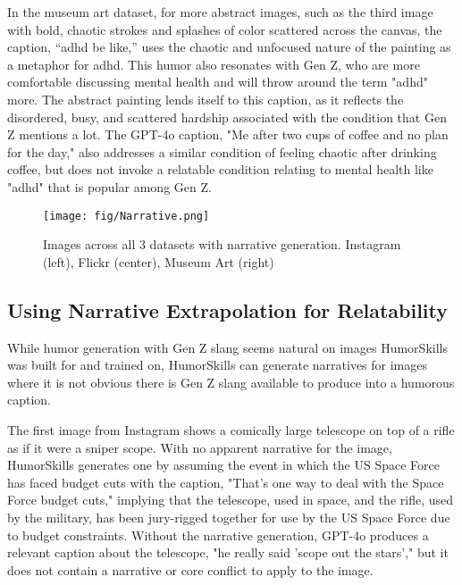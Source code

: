 In the museum art dataset, for more abstract images, such as the third image with bold, chaotic strokes and splashes of color scattered across the canvas, the caption, “adhd be like,” uses the chaotic and unfocused nature of the painting as a metaphor for adhd. This humor also resonates with Gen Z, who are more comfortable discussing mental health and will throw around the term "adhd" more. The abstract painting lends itself to this caption, as it reflects the disordered, busy, and scattered hardship associated with the condition that Gen Z mentions a lot. The GPT-4o caption, "Me after two cups of coffee and no plan for the day," also addresses a similar condition of feeling chaotic after drinking coffee, but does not invoke a relatable condition relating to mental health like "adhd" that is popular among Gen Z.

\begin{figure*}[h]
    \centering
    \texttt{[image: fig/Narrative.png]}
    \caption{Images across all 3 datasets with narrative generation. Instagram (left), Flickr (center), Museum Art (right)}
    \label{fig:narratives}
\end{figure*}

\subsection{Using Narrative Extrapolation for Relatability}
While humor generation with Gen Z slang seems natural on images HumorSkills was built for and trained on, HumorSkills can generate narratives for images where it is not obvious there is Gen Z slang available to produce into a humorous caption. 

The first image from Instagram shows a comically large telescope on top of a rifle as if it were a sniper scope. With no apparent narrative for the image, HumorSkills generates one by assuming the event in which the US Space Force has faced budget cuts with the caption, "That's one way to deal with the Space Force budget cuts," implying that the telescope, used in space, and the rifle, used by the military, has been jury-rigged together for use by the US Space Force due to budget constraints. Without the narrative generation, GPT-4o produces a relevant caption about the telescope, "he really said 'scope out the stars'," but it does not contain a narrative or core conflict to apply to the image. 


